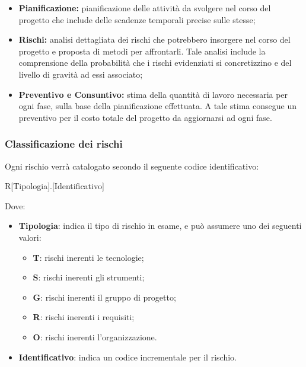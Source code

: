 \documentclass[../NormediProgetto.tex]{subfiles}
\begin{document}
\begin{itemize}
	    
	\item \textbf{Pianificazione:} pianificazione delle attività da svolgere nel corso del progetto che include delle scadenze temporali precise sulle stesse;
	
    \item \textbf{Rischi:} analisi dettagliata dei rischi che potrebbero insorgere nel corso del progetto e proposta di metodi per affrontarli. Tale analisi include la comprensione della probabilità che i rischi evidenziati si concretizzino e del livello di gravità ad essi associato;

    \item \textbf{Preventivo e Consuntivo:} stima della quantità di lavoro necessaria per ogni fase, sulla base della pianificazione effettuata. A tale stima consegue un preventivo per il costo totale del progetto da aggiornarsi ad ogni fase.
    
\end{itemize}

\subsubsection{Classificazione dei rischi}

Ogni rischio verrà catalogato secondo il seguente codice identificativo:

\begin{center}
	R[Tipologia].[Identificativo]
\end{center}

Dove:
\begin{itemize}
	\item \textbf{Tipologia}: indica il tipo di rischio in esame, e può assumere uno dei seguenti valori:
	\begin{itemize}
		\item \textbf{T}: rischi inerenti le tecnologie;
		\item \textbf{S}: rischi inerenti gli strumenti;
		\item \textbf{G}: rischi inerenti il gruppo di progetto;
		\item \textbf{R}: rischi inerenti i requisiti;
		\item \textbf{O}: rischi inerenti l'organizzazione.
	\end{itemize}
	\item \textbf{Identificativo}: indica un codice incrementale per il rischio.
\end{itemize}
\end{document}
